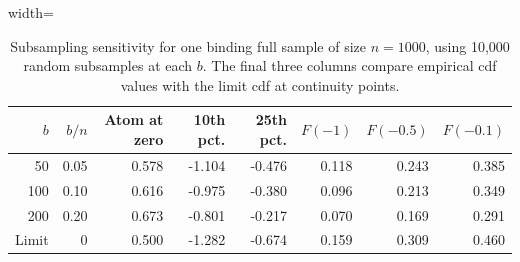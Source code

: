 \begin{table}[H]
\centering
\caption{Subsampling sensitivity for one binding full sample of size $n=1000$, using 10,000 random subsamples at each $b$. The final three columns compare empirical cdf values with the limit cdf at continuity points.}
\label{Table: subsampling sensitivity}
\begin{adjustbox}{width=\textwidth}
\small
\begin{tabular}{rrrrrrrr}
\hline
$b$ & $b/n$ & Atom at zero & 10th pct. & 25th pct. & $F(-1)$ & $F(-0.5)$ & $F(-0.1)$ \\
\hline
50 & 0.05 & 0.578 & -1.104 & -0.476 & 0.118 & 0.243 & 0.385 \\
100 & 0.10 & 0.616 & -0.975 & -0.380 & 0.096 & 0.213 & 0.349 \\
200 & 0.20 & 0.673 & -0.801 & -0.217 & 0.070 & 0.169 & 0.291 \\
Limit & 0 & 0.500 & -1.282 & -0.674 & 0.159 & 0.309 & 0.460 \\
\hline
\end{tabular}
\end{adjustbox}
\end{table}

